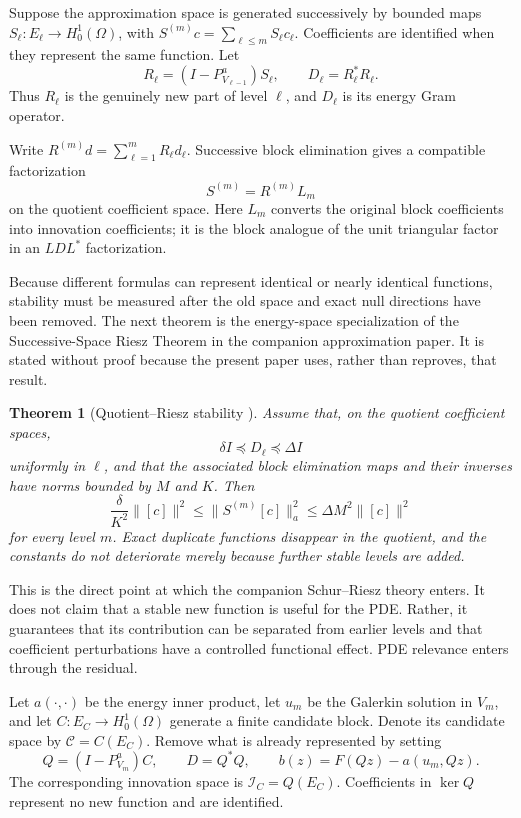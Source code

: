\documentclass[11pt]{article}
\newtheorem{theorem}{Theorem}[section]
\numberwithin{algorithm}{section}
\theoremstyle{definition}\newtheorem{definition}[theorem]{Definition}
\theoremstyle{remark}\newtheorem{remark}[theorem]{Remark}
\begin{document}
Suppose the approximation space is generated successively by bounded maps
$S_\ell:E_\ell\to H_0^1(\Omega)$, with
$S^{(m)}c=\sum_{\ell\leq m}S_\ell c_\ell$.  Coefficients are identified when
they represent the same function.  Let
\[
 R_\ell=(I-P_{V_{\ell-1}}^a)S_\ell,\qquad D_\ell=R_\ell^*R_\ell.
\]
Thus $R_\ell$ is the genuinely new part of level $\ell$, and $D_\ell$ is its
energy Gram operator.

Write $R^{(m)}d=\sum_{\ell=1}^mR_\ell d_\ell$. Successive block elimination
gives a compatible factorization
\[
 S^{(m)}=R^{(m)}L_m
\]
on the quotient coefficient space. Here $L_m$ converts the original block
coefficients into innovation coefficients; it is the block analogue of the
unit triangular factor in an $LDL^*$ factorization.

Because different formulas can represent identical or nearly identical
functions, stability must be measured after the old space and exact null
directions have been removed.  The next theorem is the energy-space
specialization of the Successive-Space Riesz Theorem in the companion
approximation paper.  It is stated without proof because the present paper
uses, rather than reproves, that result.

\begin{theorem}[Quotient--Riesz stability
  {\cite[Theorem~2.2]{dixon2026schurriesz}}]
\label{prop:main-successive-stability}
Assume that, on the quotient coefficient spaces,
\[
 \delta I\preceq D_\ell\preceq\Delta I
\]
uniformly in $\ell$, and that the associated block elimination maps and their
inverses have norms bounded by $M$ and $K$.  Then
\begin{equation}
 \frac{\delta}{K^2}\|[c]\|^2
 \leq \|S^{(m)}[c]\|_a^2
 \leq \Delta M^2\|[c]\|^2
 \label{eq:main-successive-stability}
\end{equation}
for every level $m$.  Exact duplicate functions disappear in the quotient,
and the constants do not deteriorate merely because further stable levels are
added.
\end{theorem}
This is the direct point at which the companion Schur--Riesz theory enters.
It does not claim that a stable new function is useful for the PDE.  Rather,
it guarantees that its contribution can be separated from earlier levels and
that coefficient perturbations have a controlled functional effect.  PDE
relevance enters through the residual.

Let $a(\cdot,\cdot)$ be the energy inner product, let $u_m$ be the Galerkin
solution in $V_m$, and let $C:E_C\to H_0^1(\Omega)$ generate a finite candidate
block. Denote its candidate space by $\mathcal C=C(E_C)$. Remove what is
already represented by setting
\[
 Q=(I-P_{V_m}^a)C,\qquad D=Q^*Q,
 \qquad b(z)=F(Qz)-a(u_m,Qz).
\]
The corresponding innovation space is $\mathcal I_C=Q(E_C)$.
Coefficients in $\ker Q$ represent no new function and are identified.
\end{document}
